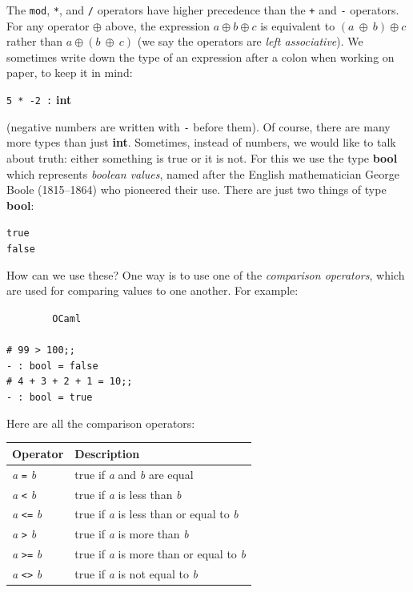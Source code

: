 \documentclass[]{book}
\newcommand{\smspace}{\vspace{4mm}}
\begin{document}
\noindent The \texttt{mod}, \texttt{*}, and \texttt{/} operators have higher precedence than the \texttt{+} and \texttt{-} operators. For any operator $\oplus$ above, the expression $a \oplus b\oplus c$ is equivalent to $(a\ \oplus\ b)\oplus c$ rather than $a \oplus (b\ \oplus\ c)$  (we say the operators are \textit{left associative}). We sometimes write down the type of an expression after a colon when working on paper, to keep it in mind:

\smspace
\texttt{5 * -2 :}\textbf{\textsf{ int}}
\smspace

\noindent (negative numbers are written with \texttt{-} before them). Of course, there are many more types than just \textsf{\textbf{int}}. Sometimes, instead of numbers, we would like to talk about truth: either something is true or it is not. For this we use the type \textsf{\textbf{bool}} which represents \textit{boolean values}, named after the English mathematician George Boole (1815--1864) who pioneered their use. There are just two things of type \textbf{\textsf{bool}}:

\smspace
{}\texttt{true}\\
\indent{}\texttt{false}
\smspace

\noindent How can we use these? One way is to use one of the \textit{comparison operators}, which are used for comparing values to one another. For example:

\smspace
\noindent\verb!        OCaml!\\
\noindent\\
\noindent\verb!# 99 > 100;;!\\
\noindent\verb!- : bool = false!\\
\noindent\verb!# 4 + 3 + 2 + 1 = 10;;!\\
\noindent\verb!- : bool = true!
\smspace

\noindent Here are all the comparison operators:

\smspace
\noindent\begin{tabular}{@{}ll@{}} \toprule
Operator & Description\\
\midrule
\index{=@\texttt{=}}\textit{a} \texttt{=} \textit{b} & true if \textit{a} and \textit{b} are equal\\
\index{<@\texttt{<}}\textit{a} \texttt{<} \textit{b} & true if \textit{a} is less than \textit{b}\\
\index{<=@\texttt{<=}}\textit{a} \texttt{<=} \textit{b} & true if \textit{a} is less than or equal to \textit{b}\\
\index{>@\texttt{>}}\textit{a} \texttt{>} \textit{b} & true if \textit{a} is more than \textit{b}\\
\index{>=@\texttt{>=}}\textit{a} \texttt{>=} \textit{b} & true if \textit{a} is more than or equal to \textit{b}\\
\index{<>@\texttt{<>}}\textit{a} \texttt{<>} \textit{b} & true if \textit{a} is not equal to \textit{b}\\ \bottomrule
\end{tabular}
\smspace
\end{document}
